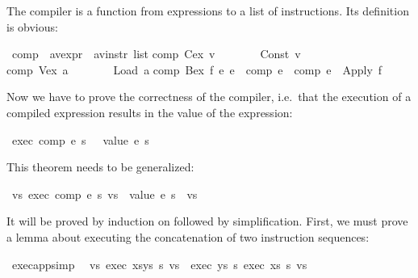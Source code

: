 \begin{isabellebody}
\begin{isamarkuptext}
The compiler is a function from expressions to a list of instructions. Its
definition is obvious:%
\end{isamarkuptext}%
\ comp\ {\isacharcolon}{\isacharcolon}\ {\isachardoublequote}{\isacharparenleft}{\isacharprime}a{\isacharcomma}{\isacharprime}v{\isacharparenright}expr\ {\isasymRightarrow}\ {\isacharparenleft}{\isacharprime}a{\isacharcomma}{\isacharprime}v{\isacharparenright}instr\ list{\isachardoublequote}\isanewline
{}\isanewline
{\isachardoublequote}comp\ {\isacharparenleft}Cex\ v{\isacharparenright}\ \ \ \ \ \ \ {\isacharequal}\ {\isacharbrackleft}Const\ v{\isacharbrackright}{\isachardoublequote}\isanewline
{\isachardoublequote}comp\ {\isacharparenleft}Vex\ a{\isacharparenright}\ \ \ \ \ \ \ {\isacharequal}\ {\isacharbrackleft}Load\ a{\isacharbrackright}{\isachardoublequote}\isanewline
{\isachardoublequote}comp\ {\isacharparenleft}Bex\ f\ e{}\ e{}{\isacharparenright}\ {\isacharequal}\ {\isacharparenleft}comp\ e{}{\isacharparenright}\ {\isacharat}\ {\isacharparenleft}comp\ e{}{\isacharparenright}\ {\isacharat}\ {\isacharbrackleft}Apply\ f{\isacharbrackright}{\isachardoublequote}%
\begin{isamarkuptext}%
Now we have to prove the correctness of the compiler, i.e.\ that the
execution of a compiled expression results in the value of the expression:%
\end{isamarkuptext}%
\ {\isachardoublequote}exec\ {\isacharparenleft}comp\ e{\isacharparenright}\ s\ {\isacharbrackleft}{\isacharbrackright}\ {\isacharequal}\ {\isacharbrackleft}value\ e\ s{\isacharbrackright}{\isachardoublequote}%
\begin{isamarkuptext}%
\noindent
This theorem needs to be generalized:%
\end{isamarkuptext}%
\ {\isachardoublequote}{\isasymforall}vs{\isachardot}\ exec\ {\isacharparenleft}comp\ e{\isacharparenright}\ s\ vs\ {\isacharequal}\ {\isacharparenleft}value\ e\ s{\isacharparenright}\ {\isacharhash}\ vs{\isachardoublequote}%
\begin{isamarkuptxt}%
\noindent
It will be proved by induction on  followed by simplification.  
First, we must prove a lemma about executing the concatenation of two
instruction sequences:%
\end{isamarkuptxt}%
\ exec{\isacharunderscore}app{\isacharbrackleft}simp{\isacharbrackright}{\isacharcolon}\isanewline
\ \ {\isachardoublequote}{\isasymforall}vs{\isachardot}\ exec\ {\isacharparenleft}xs{\isacharat}ys{\isacharparenright}\ s\ vs\ {\isacharequal}\ exec\ ys\ s\ {\isacharparenleft}exec\ xs\ s\ vs{\isacharparenright}{\isachardoublequote}%

\end{isabellebody}

